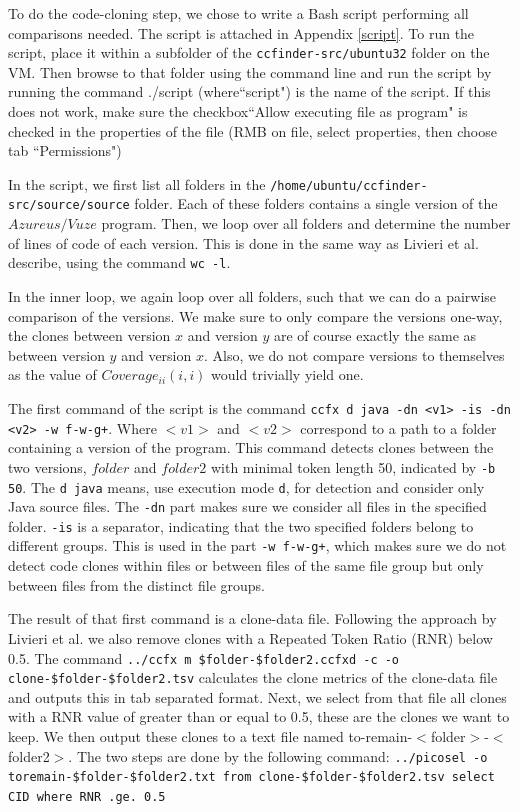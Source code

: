 \documentclass[a4paper,twoside, twocolumn, 11pt]{article}
\numberwithin{equation}{section}
\begin{document}
To do the code-cloning step, we chose to write a Bash script performing all comparisons needed.
The script is attached in Appendix \ref{script}.
To run the script, place it within a subfolder of the \texttt{ccfinder-src/ubuntu32} folder on the VM. 
Then browse to that folder using the command line and run the script by running the command ./script (where``script") is the name of the script.
If this does not work, make sure the checkbox``Allow executing file as program" is checked in the properties of the file (RMB on file, select properties, then choose tab ``Permissions")

In the script, we first list all folders in the \texttt{/home/ubuntu/ccfinder-src/source/source} folder.
Each of these folders contains a single version of the $Azureus/Vuze$ program.
Then, we loop over all folders and determine the number of lines of code of each version.
This is done in the same way as Livieri et al. describe, using the command \texttt{wc -l}.

In the inner loop, we again loop over all folders, such that we can do a pairwise comparison of the versions.
We make sure to only compare the versions one-way, the clones between version $x$ and version $y$ are of course exactly the same as between version $y$ and version $x$.
Also, we do not compare versions to themselves as the value of $Coverage_{ii}(i,i)$ would trivially yield one.

The first command of the script is the command \texttt{ccfx d java -dn <v1> -is -dn <v2> -w f-w-g+}. 
Where $<v1>$ and $<v2>$ correspond to a path to a folder containing a version of the program.
This command detects clones between the two versions, $folder$ and $folder2$ with minimal token length 50, indicated by \texttt{-b 50}.
The \texttt{d java} means, use execution mode \texttt{d}, for detection and consider only Java source files.
The \texttt{-dn} part makes sure we consider all files in the specified folder.
\texttt{-is} is a separator, indicating that the two specified folders belong to different groups. 
This is used in the part \texttt{-w f-w-g+}, which makes sure we do not detect code clones within files or between files of the same file group but only between files from the distinct file groups.

The result of that first command is a clone-data file. Following the approach by Livieri et al. we also remove clones with a Repeated Token Ratio (RNR) below 0.5. 
The command \texttt{../ccfx m \$folder-\$folder2.ccfxd -c -o clone-\$folder-\$folder2.tsv} calculates the clone metrics of the clone-data file and outputs this in tab separated format. 
Next, we select from that file all clones with a RNR value of greater than or equal to 0.5, these are the clones we want to keep. 
We then output these clones to a text file named to-remain-$<$folder$>$-$<$folder2$>$. 
The two steps are done by the following command: \texttt{../picosel -o toremain-\$folder-\$folder2.txt from clone-\$folder-\$folder2.tsv select CID where RNR .ge. 0.5}
\end{document}
